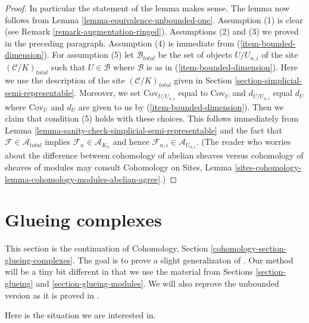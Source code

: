 \begin{proof}
\medskip\noindent
In particular the statement of the lemma makes sense.
The lemma now follows from
Lemma \ref{lemma-equivalence-unbounded-one}.
Assumption (1) is clear (see Remark \ref{remark-augmentation-ringed}).
Assumptions (2) and (3) we proved in the preceding paragraph.
Assumption (4) is immediate from (\ref{item-bounded-dimension}).
For assumption (5) let $\mathcal{B}_{total}$ be the set of
objects $U/U_{n, i}$ of the site $(\mathcal{C}/K)_{total}$
such that $U \in \mathcal{B}$ where $\mathcal{B}$ is as in
(\ref{item-bounded-dimension}). Here we use the description of
the site $(\mathcal{C}/K)_{total}$ given in
Section \ref{section-simplicial-semi-representable}.
Moreover, we set $\text{Cov}_{U/U_{n, i}}$ equal to $\text{Cov}_U$
and $d_{U/U_{n, i}}$ equal $d_U$ where $\text{Cov}_U$ and $d_U$
are given to us by (\ref{item-bounded-dimension}).
Then we claim that condition (5) holds with these choices.
This follows immediately from
Lemma \ref{lemma-sanity-check-simplicial-semi-representable}
and the fact that $\mathcal{F} \in \mathcal{A}_{total}$
implies $\mathcal{F}_n \in \mathcal{A}_{K_n}$ and hence
$\mathcal{F}_{n, i} \in \mathcal{A}_{U_{n, i}}$.
(The reader who worries about the difference between
cohomology of abelian sheaves versus cohomology
of sheaves of modules may consult Cohomology on Sites, Lemma
\ref{sites-cohomology-lemma-cohomology-modules-abelian-agree}.)
\end{proof}










\section{Glueing complexes}
\label{section-glueing-complexes}

\noindent
This section is the continuation of
Cohomology, Section \ref{cohomology-section-glueing-complexes}.
The goal is to prove a slight generalizaton of \cite[Theorem 3.2.4]{BBD}.
Our method will be a tiny bit different in that we use
the material from Sections \ref{section-glueing} and
\ref{section-glueing-modules}. We will also reprove the
unbounded version as it is proved in \cite{six-I}.

\medskip\noindent
Here is the situation we are interested in.

